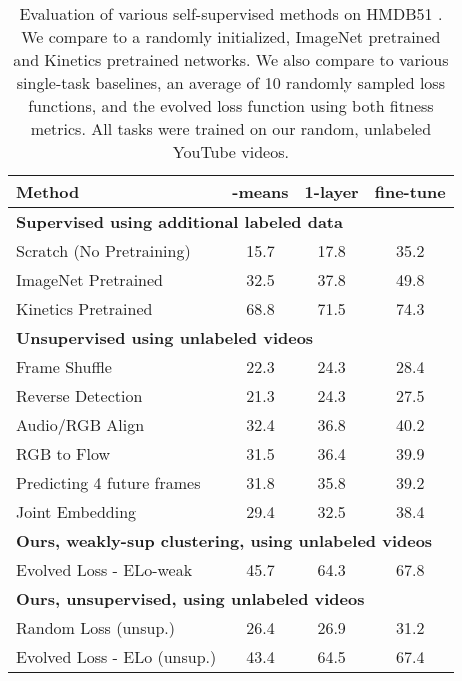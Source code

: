 \documentclass[10pt,twocolumn,letterpaper]{article}
\begin{document}
\begin{table}
\small
    \centering
    \begin{tabular}{lccc}
    \toprule
       Method  & -means & 1-layer & fine-tune \\
    \midrule
        \multicolumn{4}{l}{\textbf{Supervised using additional labeled data}}\\
        Scratch (No Pretraining) & 15.7 & 17.8 & 35.2 \\
        ImageNet Pretrained & 32.5 & 37.8 & 49.8 \\
        Kinetics Pretrained & 68.8 & 71.5 & 74.3 \\
        \midrule
        \multicolumn{4}{l}{\textbf{Unsupervised using unlabeled videos}}\\
        Frame Shuffle \cite{misra2016shuffle} & 22.3 & 24.3 & 28.4 \\
        Reverse Detection \cite{pickup2014seeing} & 21.3 & 24.3 & 27.5\\
        Audio/RGB Align \cite{owens2018audio,korbar2018cooperative}     & 32.4 & 36.8 & 40.2 \\
        RGB to Flow   & 31.5 & 36.4 & 39.9 \\
        Predicting 4 future frames & 31.8 &  35.8 & 39.2 \\
        Joint Embedding & 29.4 & 32.5 & 38.4 \\
        \midrule
        \multicolumn{4}{l}{\textbf{Ours, weakly-sup clustering, using unlabeled videos}}\\
        Evolved Loss - ELo-weak & 45.7 & 64.3 & 67.8 \\
        \midrule
        \multicolumn{4}{l}{\textbf{Ours, unsupervised, using unlabeled videos}}\\
Random Loss (unsup.)  & 26.4  & 26.9  & 31.2  \\
Evolved Loss - ELo (unsup.) & 43.4 & 64.5 & 67.4 \\
    \bottomrule
    \end{tabular}
    \caption{Evaluation of various self-supervised methods on HMDB51 \cite{kuehne2011hmdb}. We compare to a randomly initialized, ImageNet pretrained and Kinetics pretrained networks. We also compare to various single-task baselines, an average of 10 randomly sampled loss functions, and the evolved loss function using both fitness metrics. All tasks were trained on our random, unlabeled YouTube videos.}
    \label{tab:hmdb-1}
\end{table}
\end{document}
